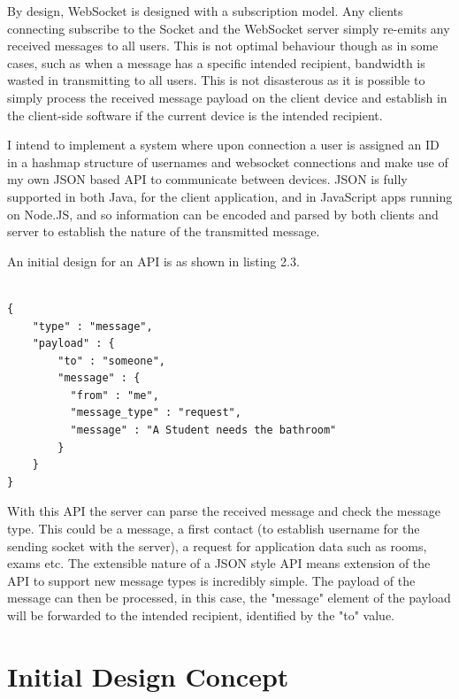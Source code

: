 \documentclass[a4paper, 12pt, notitlepage]{report}
\begin{document}
By design, WebSocket is designed with a subscription model.  Any clients connecting subscribe to the Socket and the WebSocket server simply re-emits any received messages to all users.  This is not optimal behaviour though as in some cases, such as when a message has a specific intended recipient, bandwidth is wasted in transmitting to all users.  This is not disasterous as it is possible to simply process the received message payload on the client device and establish in the client-side software if the current device is the intended recipient.

I intend to implement a system where upon connection a user is assigned an ID in a hashmap structure of usernames and websocket connections and make use of my own JSON based API to communicate between devices.  JSON is fully supported in both Java, for the client application, and in JavaScript apps running on Node.JS, and so information can be encoded and parsed by both clients and server to establish the nature of the transmitted message.

An initial design for an API is as shown in listing 2.3.

\begin{minipage}{\textwidth}
\begin{lstlisting}[captionpos=b,caption=Proposed WebSocket API for System Communication, tabsize=2, breaklines=true]

{
    "type" : "message",
    "payload" : {
        "to" : "someone",
        "message" : {
          "from" : "me",
          "message_type" : "request",
          "message" : "A Student needs the bathroom"
        }
    }
}
\end{lstlisting}
\end{minipage}

With this API the server can parse the received message and check the message type.  This could be a message, a first contact (to establish username for the sending socket with the server), a request for application data such as rooms, exams etc.  The extensible nature of a JSON style API means extension of the API to support new message types is incredibly simple.  The payload of the message can then be processed, in this case, the "message" element of the payload will be forwarded to the intended recipient, identified by the "to" value.

\section{Initial Design Concept}
\end{document}
